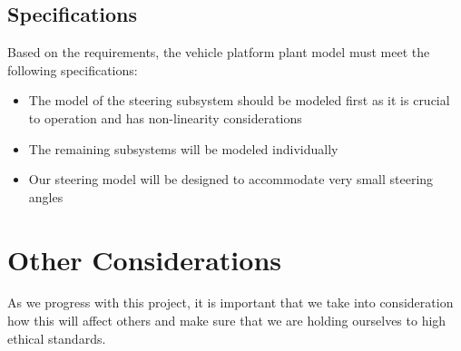 \documentclass[12pt]{article} %
\begin{document}
\subsection{Specifications}
Based on the requirements, the vehicle platform plant model must meet the following specifications:
\begin{itemize}
    \item The model of the steering subsystem should be modeled first as it is crucial to operation and has non-linearity considerations
    \item The remaining subsystems will be modeled individually 
    \item Our steering model will be designed to accommodate very small steering angles
\end{itemize}

\section{Other Considerations}
As we progress with this project, it is important that we take into consideration how this will affect others and make sure that we are holding ourselves to high ethical standards. 
\end{document}
